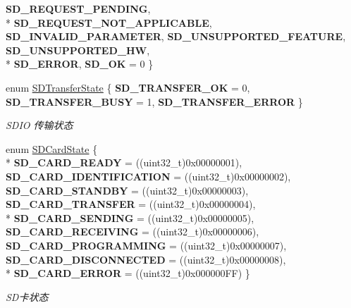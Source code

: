 \begin{DoxyCompactItemize}
{\bfseries S\+D\+\_\+\+R\+E\+Q\+U\+E\+S\+T\+\_\+\+P\+E\+N\+D\+I\+NG}, 
\\*
{\bfseries S\+D\+\_\+\+R\+E\+Q\+U\+E\+S\+T\+\_\+\+N\+O\+T\+\_\+\+A\+P\+P\+L\+I\+C\+A\+B\+LE}, 
{\bfseries S\+D\+\_\+\+I\+N\+V\+A\+L\+I\+D\+\_\+\+P\+A\+R\+A\+M\+E\+T\+ER}, 
{\bfseries S\+D\+\_\+\+U\+N\+S\+U\+P\+P\+O\+R\+T\+E\+D\+\_\+\+F\+E\+A\+T\+U\+RE}, 
{\bfseries S\+D\+\_\+\+U\+N\+S\+U\+P\+P\+O\+R\+T\+E\+D\+\_\+\+HW}, 
\\*
{\bfseries S\+D\+\_\+\+E\+R\+R\+OR}, 
{\bfseries S\+D\+\_\+\+OK} = 0
 \}
\item 
enum \hyperlink{group__sd__card_gace0484a459648257c3eae8ea60f64fbf}{S\+D\+Transfer\+State} \{ {\bfseries S\+D\+\_\+\+T\+R\+A\+N\+S\+F\+E\+R\+\_\+\+OK} = 0, 
{\bfseries S\+D\+\_\+\+T\+R\+A\+N\+S\+F\+E\+R\+\_\+\+B\+U\+SY} = 1, 
{\bfseries S\+D\+\_\+\+T\+R\+A\+N\+S\+F\+E\+R\+\_\+\+E\+R\+R\+OR}
 \}\hypertarget{group__sd__card_gace0484a459648257c3eae8ea60f64fbf}{}\label{group__sd__card_gace0484a459648257c3eae8ea60f64fbf}
\begin{DoxyCompactList}\small\item\em S\+D\+IO 传输状态 \end{DoxyCompactList}
\item 
enum \hyperlink{group__sd__card_gacdc2533a9bff7dc10def0945f5915398}{S\+D\+Card\+State} \{ \\*
{\bfseries S\+D\+\_\+\+C\+A\+R\+D\+\_\+\+R\+E\+A\+DY} = ((uint32\+\_\+t)0x00000001), 
{\bfseries S\+D\+\_\+\+C\+A\+R\+D\+\_\+\+I\+D\+E\+N\+T\+I\+F\+I\+C\+A\+T\+I\+ON} = ((uint32\+\_\+t)0x00000002), 
{\bfseries S\+D\+\_\+\+C\+A\+R\+D\+\_\+\+S\+T\+A\+N\+D\+BY} = ((uint32\+\_\+t)0x00000003), 
{\bfseries S\+D\+\_\+\+C\+A\+R\+D\+\_\+\+T\+R\+A\+N\+S\+F\+ER} = ((uint32\+\_\+t)0x00000004), 
\\*
{\bfseries S\+D\+\_\+\+C\+A\+R\+D\+\_\+\+S\+E\+N\+D\+I\+NG} = ((uint32\+\_\+t)0x00000005), 
{\bfseries S\+D\+\_\+\+C\+A\+R\+D\+\_\+\+R\+E\+C\+E\+I\+V\+I\+NG} = ((uint32\+\_\+t)0x00000006), 
{\bfseries S\+D\+\_\+\+C\+A\+R\+D\+\_\+\+P\+R\+O\+G\+R\+A\+M\+M\+I\+NG} = ((uint32\+\_\+t)0x00000007), 
{\bfseries S\+D\+\_\+\+C\+A\+R\+D\+\_\+\+D\+I\+S\+C\+O\+N\+N\+E\+C\+T\+ED} = ((uint32\+\_\+t)0x00000008), 
\\*
{\bfseries S\+D\+\_\+\+C\+A\+R\+D\+\_\+\+E\+R\+R\+OR} = ((uint32\+\_\+t)0x000000\+FF)
 \}\hypertarget{group__sd__card_gacdc2533a9bff7dc10def0945f5915398}{}\label{group__sd__card_gacdc2533a9bff7dc10def0945f5915398}
\begin{DoxyCompactList}\small\item\em S\+D卡状态 \end{DoxyCompactList}
\end{DoxyCompactItemize}
